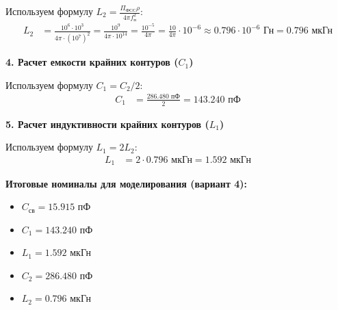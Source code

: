 Используем формулу $L_2 = \frac{\Pi_{\text{ФСС}} \rho}{4\pi f_{\text{п}}^2}$:
\begin{align*}
    L_2 &= \frac{10^6 \cdot 10^3}{4\pi \cdot (10^7)^2} = \frac{10^9}{4\pi \cdot 10^{14}} = \frac{10^{-5}}{4\pi} = \frac{10}{4\pi} \cdot 10^{-6} \approx 0.796 \cdot 10^{-6} \text{ Гн} = 0.796 \text{ мкГн}
\end{align*}

\vspace{1em}
\textbf{4. Расчет емкости крайних контуров ($C_1$)}

Используем формулу $C_1 = C_2 / 2$:
\begin{align*}
    C_1 &= \frac{286.480 \text{ пФ}}{2} = 143.240 \text{ пФ}
\end{align*}

\vspace{1em}
\textbf{5. Расчет индуктивности крайних контуров ($L_1$)}

Используем формулу $L_1 = 2L_2$:
\begin{align*}
    L_1 &= 2 \cdot 0.796 \text{ мкГн} = 1.592 \text{ мкГн}
\end{align*}

\vspace{1em}
\textbf{Итоговые номиналы для моделирования (вариант 4):}
\begin{itemize}
    \item $C_{\text{св}} = 15.915 \text{ пФ}$
    \item $C_1 = 143.240 \text{ пФ}$
    \item $L_1 = 1.592 \text{ мкГн}$
    \item $C_2 = 286.480 \text{ пФ}$
    \item $L_2 = 0.796 \text{ мкГн}$
\end{itemize}
